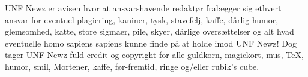 \begin{minipage}[b]{0.95\linewidth}
\begin{center}
\tiny UNF Newz er avisen hvor at ansvarshavende redaktør fralægger sig ethvert ansvar for eventuel plagiering, kaniner, tysk, stavefelj, kaffe, dårlig humor, glemsomhed, katte, store sigmaer, pile, skyer, dårlige oversættelser og alt hvad eventuelle homo sapiens sapiens kunne finde på at holde imod UNF Newz! Dog tager UNF Newz fuld credit og copyright for alle guldkorn, magickort, mus, \TeX, humor, smil, Mortener, kaffe, før-fremtid, ringe og/eller rubik's cube.
\end{center}
\end{minipage}

